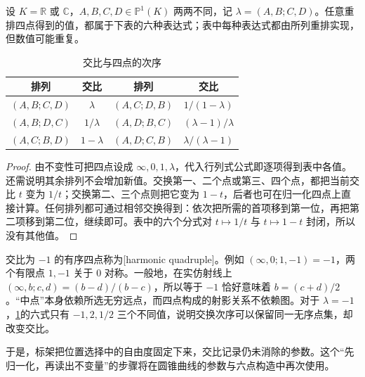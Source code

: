 \begin{proposition}\label{g1:prop:cross-ratio-permutations}
	设 \(K=\mathbb R\) 或 \(\mathbb C\)，\(A,B,C,D\in\mathbb P^1(K)\) 两两不同，记 \(\lambda=(A,B;C,D)\)。任意重排四点得到的值，都属于下表的六种表达式；表中每种表达式都由所列重排实现，但数值可能重复。


\begin{table}[htbp]
	\centering
	\caption{交比与四点的次序}
	\label{g1:tab:cross-ratio-permutations}
	\begin{tabular}{cccc}
		\toprule
		排列&交比&排列&交比\\
		\midrule
		\((A,B;C,D)\)&\(\lambda\)&\((A,C;D,B)\)&\(1/(1-\lambda)\)\\
		\((A,B;D,C)\)&\(1/\lambda\)&\((A,D;B,C)\)&\((\lambda-1)/\lambda\)\\
		\((A,C;B,D)\)&\(1-\lambda\)&\((A,D;C,B)\)&\(\lambda/(\lambda-1)\)\\
		\bottomrule
	\end{tabular}
\end{table}
\end{proposition}

\begin{proof}
	由不变性可把四点设成 \(\infty,0,1,\lambda\)，代入行列式公式即逐项得到表中各值。还需说明其余排列不会增加新值。交换第一、二个点或第三、四个点，都把当前交比 \(t\) 变为 \(1/t\)；交换第二、三个点则把它变为 \(1-t\)，后者也可在归一化四点上直接计算。任何排列都可通过相邻交换得到：依次把所需的首项移到第一位，再把第二项移到第二位，继续即可。表中的六个分式对 \(t\mapsto1/t\) 与 \(t\mapsto1-t\) 封闭，所以没有其他值。
\end{proof}

\begin{example}\label{g1:exm:harmonic-quadruple}
	交比为 \(-1\) 的有序四点称为[harmonic quadruple]。例如 \((\infty,0;1,-1)=-1\)，两个有限点 \(1,-1\) 关于 \(0\) 对称。一般地，在实仿射线上 \((\infty,b;c,d)=(b-d)/(b-c)\)，所以等于 \(-1\) 恰好意味着 \(b=(c+d)/2\)。“中点”本身依赖所选无穷远点，而四点构成的射影关系不依赖图。对于 \(\lambda=-1\)，\cref{g1:tab:cross-ratio-permutations}的六式只有 \(-1,2,1/2\) 三个不同值，说明交换次序可以保留同一无序点集，却改变交比。
\end{example}

于是，标架把位置选择中的自由度固定下来，交比记录仍未消除的参数。这个“先归一化，再读出不变量”的步骤将在圆锥曲线的参数与六点构造中再次使用。
